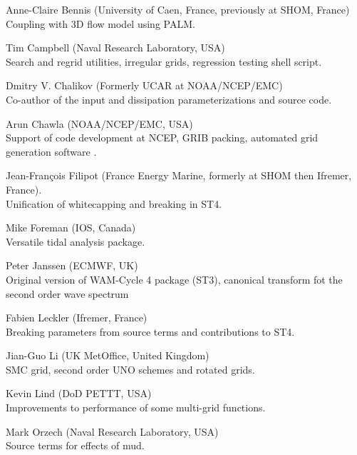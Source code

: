 \begin{list}{\ldots}{ }
\item [Anne-Claire Bennis] (University of Caen, France, previously at SHOM, France) \\
  Coupling with 3D flow model using PALM.

\item [Tim Campbell] (Naval Research Laboratory, USA)\\ 
  Search and regrid utilities, irregular grids, regression testing
  shell script.

\item [Dmitry V. Chalikov] (Formerly UCAR at NOAA/NCEP/EMC) \\ Co-author of the
  \cite{tol:JPO96} input and dissipation parameterizations and source code.

\item [Arun Chawla](NOAA/NCEP/EMC, USA) \\
  Support of code development at NCEP, GRIB packing, automated grid generation
  software \citep{tol:MMAB07a, tol:OMOD08a}.

\item [Jean-Fran{\c c}ois Filipot] (France Energy Marine, formerly at SHOM then Ifremer, France).\\
  Unification of whitecapping and breaking in ST4. 

\item [Mike Foreman]  (IOS, Canada) \\
  Versatile tidal analysis package. 

\item [Peter Janssen] (ECMWF, UK) \\
  Original version of WAM-Cycle 4 package (ST3), canonical transform fot the second order wave spectrum 

\item [Fabien Leckler] (Ifremer, France) \\
  Breaking parameters from source terms and contributions to ST4.

\item [Jian-Guo Li] (UK MetOffice, United Kingdom) \\
  SMC grid, second order UNO schemes and rotated grids.

\item [Kevin Lind]  (DoD PETTT, USA)\\ 
  Improvements to performance of some multi-grid functions.

\item [Mark Orzech]  (Naval Research Laboratory, USA)\\ 
  Source terms for effects of mud.


\end{list}
